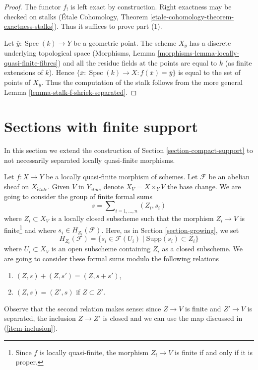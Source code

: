 \documentclass{stacks-project}
\theoremstyle{plain}
\theoremstyle{definition}
\theoremstyle{remark}
\numberwithin{equation}{subsection}
\def\Spec{\mathop{\mathrm{Spec}}}
\def\etale{{\acute{e}tale}}
\begin{document}
\begin{proof}
The functor $f_!$ is left exact by construction. Right exactness may
be checked on stalks
(\'Etale Cohomology, Theorem \ref{etale-cohomology-theorem-exactness-stalks}).
Thus it suffices to prove part (1).

\medskip\noindent
Let $\overline{y} : \Spec(k) \to Y$ be a geometric point.
The scheme $X_{\overline{y}}$ has a discrete underlying
topological space
(Morphisms, Lemma \ref{morphisms-lemma-locally-quasi-finite-fibres})
and all the residue fields at the points are equal to $k$
(as finite extensions of $k$). Hence
$\{\overline{x} : \Spec(k) \to X : f(\overline{x}) = \overline{y}\}$
is equal to the set of points of $X_{\overline{y}}$.
Thus the computation of the stalk follows from the more general
Lemma \ref{lemma-stalk-f-shriek-separated}.
\end{proof}









\section{Sections with finite support}
\label{section-finite-support}

\noindent
In this section we extend the construction of
Section \ref{section-compact-support} to not necessarily
separated locally quasi-finite morphisms.

\medskip\noindent
Let $f : X \to Y$ be a locally quasi-finite morphism of schemes.
Let $\mathcal{F}$ be an abelian sheaf on $X_\etale$. Given $V$ in
$Y_\etale$ denote $X_V = X \times_Y V$ the base change. We are going
to consider the group of finite formal sums
\begin{equation}
\label{equation-formal-sum}
s = \sum\nolimits_{i = 1, \ldots, n} (Z_i, s_i)
\end{equation}
where $Z_i \subset X_V$ is a locally closed subscheme such that the
morphism $Z_i \to V$ is finite\footnote{Since $f$ is locally quasi-finite,
the morphism $Z_i \to V$ is finite if and only if it is proper.}
and where $s_i \in H_{Z_i}(\mathcal{F})$. Here, as in
Section \ref{section-growing}, we set
$$
H_{Z_i}(\mathcal{F}) =
\{s_i \in \mathcal{F}(U_i) \mid \text{Supp}(s_i) \subset Z_i\}
$$
where $U_i \subset X_V$ is an open subscheme containing $Z_i$ as a
closed subscheme. We are going to consider these formal sums modulo the
following relations
\begin{enumerate}
\item
\label{item-sum}
$(Z, s) + (Z, s') = (Z, s + s')$,
\item
\label{item-sub}
$(Z, s) = (Z', s)$ if $Z \subset Z'$.
\end{enumerate}
Observe that the second relation makes sense: since $Z \to V$ is finite
and $Z' \to V$ is separated, the inclusion $Z \to Z'$ is closed and we
can use the map discussed in (\ref{item-inclusion}).
\end{document}
